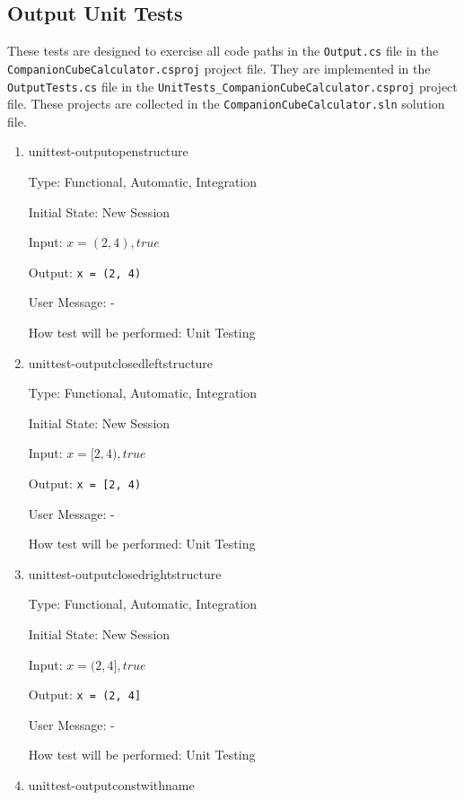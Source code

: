 \documentclass[12pt, titlepage]{article}
\begin{document}
\subsection{Output Unit Tests}
These tests are designed to exercise all code paths in the \texttt{Output.cs} 
file in the \texttt{CompanionCubeCalculator.csproj} project file. They are 
implemented in the \texttt{OutputTests.cs} file in the 
\texttt{UnitTests\_CompanionCubeCalculator.csproj} project file. These projects 
are collected in the \texttt{CompanionCubeCalculator.sln} solution file.

\begin{enumerate}
	
	\item{unittest-outputopenstructure}
	
	Type: Functional, Automatic, Integration
	
	Initial State: New Session
	
	Input: $x = (2,4), true$
	
	Output: \texttt{x = (2, 4)}
	
	User Message: - 
	
	How test will be performed: Unit Testing\\
	
	\item{unittest-outputclosedleftstructure}
	
	Type: Functional, Automatic, Integration
	
	Initial State: New Session
	
	Input: $x = [2,4), true$
	
	Output: \texttt{x = [2, 4)}
	
	User Message: - 
	
	How test will be performed: Unit Testing\\
	
	\item{unittest-outputclosedrightstructure}
	
	Type: Functional, Automatic, Integration
	
	Initial State: New Session
	
	Input: $x = (2,4], true$
	
	Output: \texttt{x = (2, 4]}
	
	User Message: - 
	
	How test will be performed: Unit Testing\\
	
	\item{unittest-outputconstwithname}
	

\end{enumerate}
\end{document}
